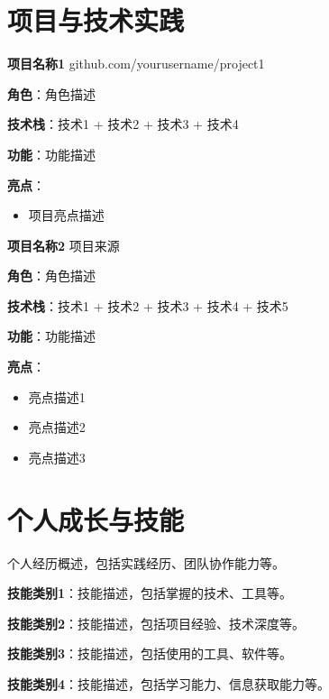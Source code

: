 \documentclass[11pt]{article}
\newlength{\iconwidth}
\begin{document}
    \begin{minipage}[t]{\textwidth}
    \section[项目与技术实践]{\makebox[\iconwidth][c]{\color{primary_color}{\faCode}}\quad 项目与技术实践}

        {\large \textbf{项目名称1}} \hfill github.com/yourusername/project1
        \item \textbf{角色}：角色描述
        \item \textbf{技术栈}：技术1 + 技术2 + 技术3 + 技术4
        \item \textbf{功能}：功能描述
        \item \textbf{亮点}：
        \begin{itemize}
            \item 项目亮点描述
        \end{itemize}
    
    \vspace{0.5em}
    
    {\large \textbf{项目名称2}} \hfill 项目来源
    \item \textbf{角色}：角色描述
        \item \textbf{技术栈}：技术1 + 技术2 + 技术3 + 技术4 + 技术5
        \item \textbf{功能}：功能描述
        \item \textbf{亮点}：
        \begin{itemize}
            \item 亮点描述1
            \item 亮点描述2
            \item 亮点描述3
        \end{itemize}
    
    \vspace{0.5em}
    \end{minipage}

    \begin{minipage}[t]{\textwidth}

    \section[个人成长]{\makebox[\iconwidth][c]{\color{primary_color}{\faBookOpen}}\quad 个人成长与技能}

    个人经历概述，包括实践经历、团队协作能力等。
    
    \item \textbf{技能类别1}：技能描述，包括掌握的技术、工具等。
    
    \item \textbf{技能类别2}：技能描述，包括项目经验、技术深度等。
    
    \item \textbf{技能类别3}：技能描述，包括使用的工具、软件等。
    
    \item \textbf{技能类别4}：技能描述，包括学习能力、信息获取能力等。
    \end{minipage}
\end{document}
